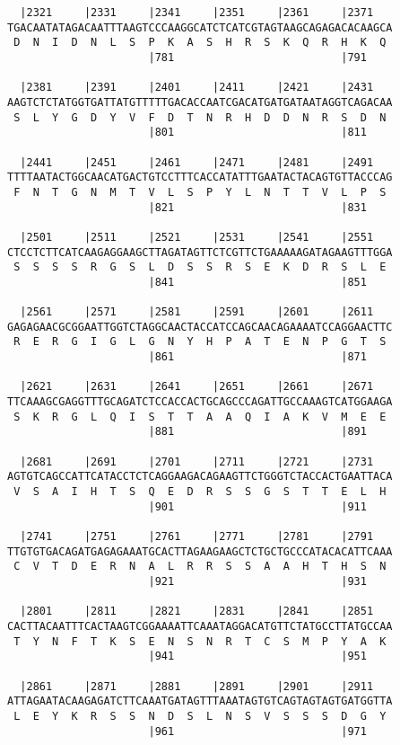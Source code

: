 \documentclass{article}
\begin{document}
\begin{Verbatim}
  |2321     |2331     |2341     |2351     |2361     |2371   
TGACAATATAGACAATTTAAGTCCCAAGGCATCTCATCGTAGTAAGCAGAGACACAAGCA
 D  N  I  D  N  L  S  P  K  A  S  H  R  S  K  Q  R  H  K  Q 
                      |781                          |791    
  
  |2381     |2391     |2401     |2411     |2421     |2431   
AAGTCTCTATGGTGATTATGTTTTTGACACCAATCGACATGATGATAATAGGTCAGACAA
 S  L  Y  G  D  Y  V  F  D  T  N  R  H  D  D  N  R  S  D  N 
                      |801                          |811    
  
  |2441     |2451     |2461     |2471     |2481     |2491   
TTTTAATACTGGCAACATGACTGTCCTTTCACCATATTTGAATACTACAGTGTTACCCAG
 F  N  T  G  N  M  T  V  L  S  P  Y  L  N  T  T  V  L  P  S 
                      |821                          |831    
  
  |2501     |2511     |2521     |2531     |2541     |2551   
CTCCTCTTCATCAAGAGGAAGCTTAGATAGTTCTCGTTCTGAAAAAGATAGAAGTTTGGA
 S  S  S  S  R  G  S  L  D  S  S  R  S  E  K  D  R  S  L  E 
                      |841                          |851    
  
  |2561     |2571     |2581     |2591     |2601     |2611   
GAGAGAACGCGGAATTGGTCTAGGCAACTACCATCCAGCAACAGAAAATCCAGGAACTTC
 R  E  R  G  I  G  L  G  N  Y  H  P  A  T  E  N  P  G  T  S 
                      |861                          |871    
  
  |2621     |2631     |2641     |2651     |2661     |2671   
TTCAAAGCGAGGTTTGCAGATCTCCACCACTGCAGCCCAGATTGCCAAAGTCATGGAAGA
 S  K  R  G  L  Q  I  S  T  T  A  A  Q  I  A  K  V  M  E  E 
                      |881                          |891    
  
  |2681     |2691     |2701     |2711     |2721     |2731   
AGTGTCAGCCATTCATACCTCTCAGGAAGACAGAAGTTCTGGGTCTACCACTGAATTACA
 V  S  A  I  H  T  S  Q  E  D  R  S  S  G  S  T  T  E  L  H 
                      |901                          |911    
  
  |2741     |2751     |2761     |2771     |2781     |2791   
TTGTGTGACAGATGAGAGAAATGCACTTAGAAGAAGCTCTGCTGCCCATACACATTCAAA
 C  V  T  D  E  R  N  A  L  R  R  S  S  A  A  H  T  H  S  N 
                      |921                          |931    
  
  |2801     |2811     |2821     |2831     |2841     |2851   
CACTTACAATTTCACTAAGTCGGAAAATTCAAATAGGACATGTTCTATGCCTTATGCCAA
 T  Y  N  F  T  K  S  E  N  S  N  R  T  C  S  M  P  Y  A  K 
                      |941                          |951    
  
  |2861     |2871     |2881     |2891     |2901     |2911   
ATTAGAATACAAGAGATCTTCAAATGATAGTTTAAATAGTGTCAGTAGTAGTGATGGTTA
 L  E  Y  K  R  S  S  N  D  S  L  N  S  V  S  S  S  D  G  Y 
                      |961                          |971    
  

\end{Verbatim}
\end{document}

